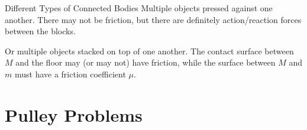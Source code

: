 \documentclass[12pt,compress,aspectratio=169]{beamer}
\begin{document}
\begin{frame}{Different Types of Connected Bodies}
  Multiple objects pressed against one another. There may not be friction, but
  there are definitely action/reaction forces between the blocks.
  \begin{center}
  \end{center}
  Or multiple objects stacked on top of one another. The contact surface between
  $M$ and the floor may (or may not) have friction, while the surface between
  $M$ and $m$ must have a friction coefficient $\mu$.
  \begin{center}
  \end{center}
\end{frame}



\section{Pulley Problems}
\end{document}
